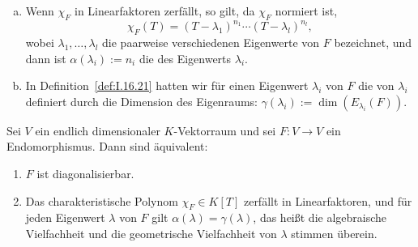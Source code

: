 \begin{erinnerung}
	\label{erinnerung:2.7}
	\begin{enumerate}[(a)]
		\item Wenn $\chi_F$ in Linearfaktoren zerfällt, so gilt, da $\chi_F$ normiert ist,
		\[
			\chi_F(T) = (T-\lambda_1)^{n_1} \cdots (T-\lambda_l)^{n_l},
		\]
		wobei $\lambda_1,\dots,\lambda_l$ die paarweise verschiedenen Eigenwerte von $F$ bezeichnet, und dann ist $\alpha(\lambda_i) := n_i$ die  des Eigenwerts $\lambda_i$.
		\item In Definition~\ref{def:I.16.21} hatten wir für einen Eigenwert $\lambda_i$ von $F$ die  von $\lambda_i$ definiert durch die Dimension des Eigenraums: $\gamma(\lambda_i) := \dim(E_{\lambda_i}(F))$.
	\end{enumerate}
\end{erinnerung}

\begin{satz}
	\label{satz:2.8}
	Sei $V$ ein endlich dimensionaler $K$-Vektorraum und sei $F \colon V \rightarrow V$ ein Endomorphismus.
	Dann sind äquivalent:
	\begin{enumerate}[(1)]
		\item $F$ ist diagonalisierbar.
		\item Das charakteristische Polynom $\chi_F \in K[T]$ zerfällt in Linearfaktoren, und für jeden Eigenwert $\lambda$ von $F$ gilt $\alpha(\lambda) = \gamma(\lambda)$, das heißt die algebraische Vielfachheit und die geometrische Vielfachheit von $\lambda$ stimmen überein.
	\end{enumerate}
\end{satz}

